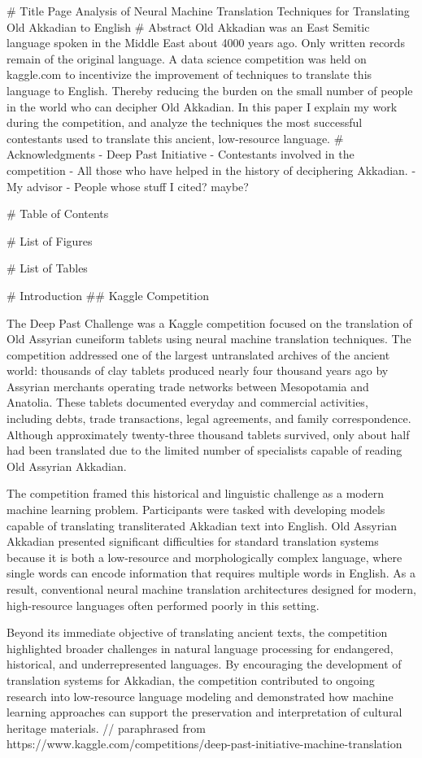 # Title Page
 Analysis of Neural Machine Translation Techniques for Translating Old Akkadian to English
# Abstract
Old Akkadian was an East Semitic language spoken in the Middle East about 4000 years ago. Only written records remain of the original language. A data science competition was held on kaggle.com to incentivize the improvement of techniques to translate this language to English. Thereby reducing the burden on the small number of people in the world who can decipher Old Akkadian. In this paper I explain my work during the competition, and analyze the techniques the most successful contestants used to translate this ancient, low-resource language.
# Acknowledgments
- Deep Past Initiative
- Contestants involved in the competition
- All those who have helped in the history of deciphering Akkadian.
- My advisor
- People whose stuff I cited? maybe?

# Table of Contents
 
# List of Figures
 
# List of Tables
 
# Introduction
## Kaggle Competition


The Deep Past Challenge was a Kaggle competition focused on the translation of Old Assyrian cuneiform tablets using neural machine translation techniques. The competition addressed one of the largest untranslated archives of the ancient world: thousands of clay tablets produced nearly four thousand years ago by Assyrian merchants operating trade networks between Mesopotamia and Anatolia. These tablets documented everyday and commercial activities, including debts, trade transactions, legal agreements, and family correspondence. Although approximately twenty-three thousand tablets survived, only about half had been translated due to the limited number of specialists capable of reading Old Assyrian Akkadian.

The competition framed this historical and linguistic challenge as a modern machine learning problem. Participants were tasked with developing models capable of translating transliterated Akkadian text into English. Old Assyrian Akkadian presented significant difficulties for standard translation systems because it is both a low-resource and morphologically complex language, where single words can encode information that requires multiple words in English. As a result, conventional neural machine translation architectures designed for modern, high-resource languages often performed poorly in this setting.

Beyond its immediate objective of translating ancient texts, the competition highlighted broader challenges in natural language processing for endangered, historical, and underrepresented languages. By encouraging the development of translation systems for Akkadian, the competition contributed to ongoing research into low-resource language modeling and demonstrated how machine learning approaches can support the preservation and interpretation of cultural heritage materials. // paraphrased from https://www.kaggle.com/competitions/deep-past-initiative-machine-translation

